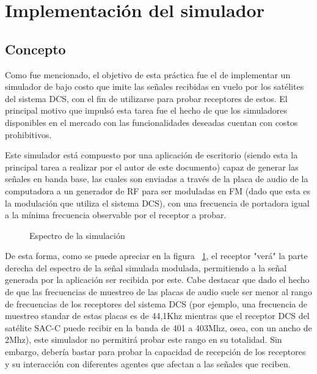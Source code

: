 \documentclass[a4paper,10pt]{article}
\begin{document}
\section{Implementación del simulador}
\subsection{Concepto}
Como fue mencionado, el objetivo de esta práctica fue el de implementar un simulador de bajo costo que imite las señales recibidas en vuelo por los satélites del sistema DCS, con el fin de utilizarse para probar receptores de estos. El principal motivo que impulsó esta tarea fue el hecho de que los simuladores disponibles en el mercado con las funcionalidades deseadas cuentan con costos prohibitivos.
\par
Este simulador está compuesto por una aplicación de escritorio (siendo esta  la principal tarea a realizar por el autor de este documento) capaz de generar las señales en banda base, las cuales son enviadas a través de la placa de audio de la computadora a un
generador de RF para ser moduladas en FM (dado que esta es la modulación que utiliza el sistema DCS), con una frecuencia de portadora igual a la mínima frecuencia observable por el receptor a probar. 

\begin{figure}[H]
\centering
{}
\caption{Espectro de la simulación}
\label{espectroSim}
\end{figure}

\par
De esta forma, como se puede apreciar en la figura ~\ref{espectroSim}, el receptor "verá"  la parte derecha del espectro de la señal simulada modulada, permitiendo a la señal generada por la aplicación ser recibida por este. Cabe destacar que dado el hecho de que las frecuencias de muestreo de las placas de audio suele ser menor al rango de frecuencias de los receptores del sistema DCS (por ejemplo, una frecuencia de muestreo standar de estas placas es de 44,1Khz mientras que el receptor DCS del satélite SAC-C puede recibir en la banda de 401 a 403Mhz, osea, con un ancho de 2Mhz),  este simulador no permitirá probar este rango en su totalidad. Sin embargo, debería bastar para probar la capacidad de recepción de los receptores y su interacción con diferentes agentes que afectan a las señales que reciben.
\end{document}
